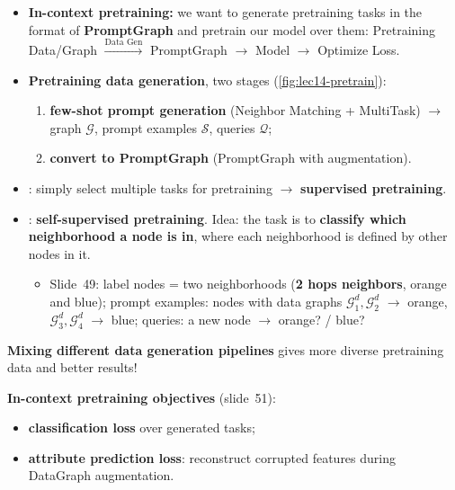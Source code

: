 \begin{itemize}
  \item \textbf{In-context pretraining:} we want to generate pretraining tasks in the
    format of \textbf{PromptGraph} and pretrain our model over them: Pretraining
    Data/Graph $\xrightarrow{\text{Data Gen}}$ PromptGraph $\to$ Model $\to$ Optimize Loss.
  \item \textbf{Pretraining data generation}, two stages (\cref{fig:lec14-pretrain}):
    \begin{enumerate}
      \item \textbf{few-shot prompt generation} (Neighbor Matching + MultiTask) $\to$
        graph $\mathcal{G}$, prompt examples $\mathcal{S}$, queries $\mathcal{Q}$;
      \item \textbf{convert to PromptGraph} (PromptGraph with augmentation).
    \end{enumerate}
  \item {}: simply select multiple tasks for pretraining $\to$
    \textbf{supervised pretraining}.
  \item {}: \textbf{self-supervised pretraining}. Idea: the task is
    to \textbf{classify which neighborhood a node is in}, where each neighborhood is
    defined by other nodes in it.
    \begin{itemize}
      \item Slide~49: label nodes = two neighborhoods (\textbf{2 hops neighbors}, orange
        and blue); prompt examples: nodes with data graphs $\mathcal{G}_1^d,
        \mathcal{G}_2^d$ $\to$ orange, $\mathcal{G}_3^d, \mathcal{G}_4^d$ $\to$ blue;
        queries: a new node $\to$ orange? / blue?
    \end{itemize}
\end{itemize}
\begin{keyidea}
  \textbf{Mixing different data generation pipelines} gives more diverse pretraining data
  and better results!
\end{keyidea}
\textbf{In-context pretraining objectives} (slide~51):
\begin{itemize}
  \item \textbf{classification loss} over generated tasks;
  \item \textbf{attribute prediction loss}: reconstruct corrupted features during
    DataGraph augmentation.
\end{itemize}

